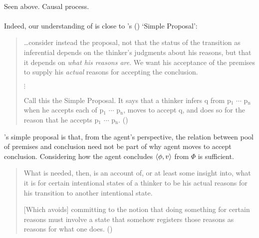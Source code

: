\paragraph{\textcite{Boghossian:2014aa}}

\begin{note}
  Seen above.
  Causal process.
\end{note}

\paragraph{\textcite{Wright:2014tt}}

\begin{note}
  Indeed, our understanding of \support{} is close to \citeauthor{Wright:2014tt}'s (\citeyear{Wright:2014tt}) `Simple Proposal':
  \begin{quote}
    \dots consider instead the proposal, not that the status of the transition as inferential depends on the thinker's judgments about his reasons, but that it depends on \emph{what his reasons are}.
    We want his acceptance of the premises to supply his \emph{actual} reasons for accepting the conclusion.

    \mbox{}\hfill\(\vdots\)\hfill\mbox{}

    Call this the Simple Proposal.
    It says that a thinker infers q from p\(_{1}\) \(\cdots\) p\(_{\text{n}}\) when he accepts each of p\(_{1}\) \(\cdots\) p\(_{\text{n}}\), moves to accept q, and does so for the reason that he accepts p\(_{1}\) \(\cdots\) p\(_{\text{n}}\).%
    \mbox{}\hfill\mbox{(\citeyear[33]{Wright:2014tt})}
  \end{quote}

  \citeauthor{Wright:2014tt}'s simple proposal is that, from the agent's perspective, the relation between pool of premises and conclusion need not be part of why agent moves to accept conclusion.
  Considering how the agent concludes \(\langle \phi, v \rangle\) from \(\Phi\) is sufficient.

  \begin{quote}
      What is needed, then, is an account of, or at least some insight into, what it is for certain intentional states of a thinker to be his actual reasons for his transition to another intentional state.

      [Which avoids] committing to the notion that doing something for certain reasons must involve a state that somehow registers those reasons as reasons for what one does.%
      \mbox{}\hfill\mbox{(\citeyear[34]{Wright:2014tt})}
    \end{quote}


\end{note}
